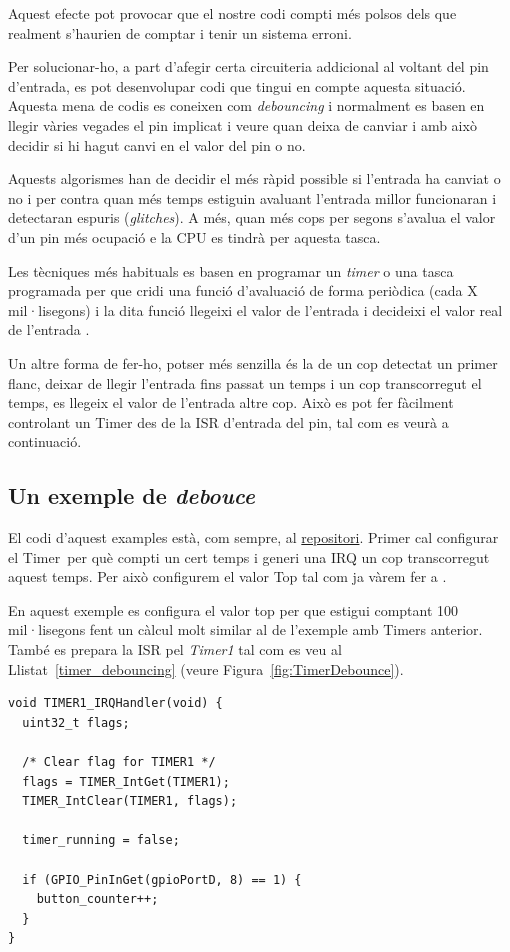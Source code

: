 Aquest efecte pot provocar que el nostre codi compti més polsos dels que realment s'haurien de comptar i tenir un sistema erroni.

Per solucionar-ho, a part d'afegir certa circuiteria addicional al voltant del pin d'entrada, es pot desenvolupar codi que tingui en compte aquesta situació. Aquesta mena de codis es coneixen com {\em debouncing} i normalment es basen en llegir vàries vegades el pin implicat i veure quan deixa de canviar i amb això decidir si hi hagut canvi en el valor del pin o no.

Aquests algorismes han de decidir el més ràpid possible si l'entrada ha canviat o no i per contra quan més temps estiguin avaluant l'entrada millor funcionaran i detectaran espuris ({\em glitches}). A més, quan més cops per segons s'avalua el valor d'un pin més ocupació e la CPU es tindrà per aquesta tasca.

Les tècniques més habituals es basen en programar un {\em timer} o una tasca programada per que cridi una funció d'avaluació de forma periòdica (cada X mil·lisegons) i la dita funció llegeixi el valor de l'entrada i decideixi el valor real de l'entrada \cite{debounce1}\cite{debounce2}.

Un altre forma de fer-ho, potser més senzilla és la de un cop detectat un primer flanc, deixar de llegir l'entrada fins passat un temps i un cop transcorregut el temps, es llegeix el valor de l'entrada altre cop. Això es pot fer fàcilment controlant un Timer des de la ISR d'entrada del pin, tal com es veurà a continuació.

\subsection{Un exemple de {\em debouce}}
El codi d'aquest examples està, com sempre, al \href{https://github.com/mariusmm/cursembedded/tree/master/Simplicity/GPIO_Debouncing}{repositori}.
Primer cal configurar el Timer per què compti un cert temps i generi una IRQ un cop transcorregut aquest temps. Per això configurem el valor Top tal com ja vàrem fer a .

En aquest exemple es configura el valor top per que estigui comptant 100 mil·lisegons fent un càlcul molt similar al de l'exemple amb Timers anterior. També es prepara la \gls{ISR} pel {\em Timer1} tal com es veu al Llistat~\ref{timer_debouncing} (veure Figura~\ref{fig:TimerDebounce}).

\begin{lstlisting}[style=customc, caption=ISR del timer per fer debouncing, label=timer_debouncing]
void TIMER1_IRQHandler(void) {
  uint32_t flags;

  /* Clear flag for TIMER1 */
  flags = TIMER_IntGet(TIMER1);
  TIMER_IntClear(TIMER1, flags);

  timer_running = false;

  if (GPIO_PinInGet(gpioPortD, 8) == 1) {
    button_counter++;
  }
} 
\end{lstlisting}


